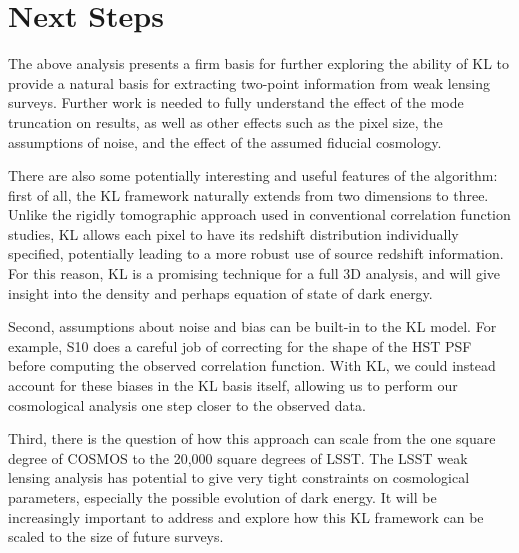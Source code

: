 \section{Next Steps}
The above analysis presents a firm basis for further exploring the ability of
KL to provide a natural basis for extracting two-point information from
weak lensing surveys.  Further work is needed to fully understand the effect
of the mode truncation on results, as well as other effects such as the
pixel size, the assumptions of noise, and the effect of the assumed fiducial
cosmology.

There are also some potentially interesting and useful features of the
algorithm: first of all, the KL framework naturally extends from two dimensions
to three.  Unlike the rigidly tomographic approach used in conventional
correlation function studies, KL allows each pixel to have its redshift
distribution individually specified, potentially leading to a more robust
use of source redshift information.  For this reason, KL is a promising
technique for a full 3D analysis, and will give insight into the density and
perhaps equation of state of dark energy.

Second, assumptions about noise and bias can be built-in to the KL model.
For example, S10 does a careful job of correcting for the shape of the HST PSF
before computing the observed correlation function.  With KL, we could instead
account for these biases in the KL basis itself, allowing us to perform our
cosmological analysis one step closer to the observed data.

Third, there is the question of how this approach can scale from the one
square degree of COSMOS to the 20,000 square degrees of LSST.  The LSST
weak lensing analysis has potential to give very tight constraints on
cosmological parameters, especially the possible evolution of dark energy.
It will be increasingly important to address and explore how this KL
framework can be scaled to the size of future surveys.
